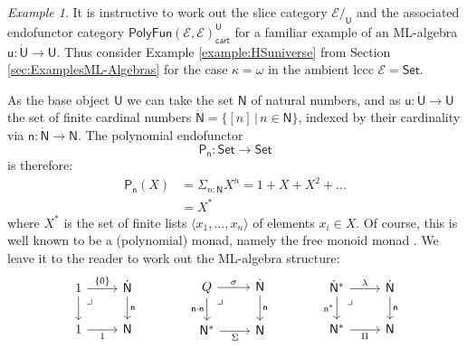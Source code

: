 \documentclass[12pt,reqno]{amsart}
\newcommand{\N}{\ensuremath{\mathbb{N}}}
\newcommand{\EE}{\ensuremath{\mathcal{E}}}
\newcommand{\Set}{\ensuremath{\mathsf{Set}}}
\newcommand{\alg}[1]{\ensuremath{\mathsf{#1}}}
\renewcommand{\to}{\ensuremath{\rightarrow}}
\renewcommand{\t}{\ensuremath{\mathsf{u}}}
\newcommand{\T}{\ensuremath{\mathsf{U}}}
\newcommand{\TT}{\ensuremath{\dot{\mathsf{U}}}}
\newcommand{\n}{\ensuremath{\mathsf{n}}}
\renewcommand{\N}{\ensuremath{\mathsf{N}}}
\newcommand{\NN}{\ensuremath{\dot{\mathsf{N}}}}
\newcommand{\pbcorner}{\arrow[dr,phantom,"\lrcorner" very near start, shift right=.5ex]} %
\theoremstyle{remark}
\newtheorem{example}[theorem]{Example}
\theoremstyle{definition}
\begin{document}
\begin{example}
It is instructive to work out the slice category $\EE/_\T$ and the associated endofunctor category $\mathsf{PolyFun}(\EE, \EE)_{\mathsf{cart}}^\T$ for a familiar example of an ML-algebra $\t:\TT\to\T$. Thus consider Example \ref{example:HSuniverse} from Section \ref{sec:ExamplesML-Algebras} for the case $\kappa = \omega$ in the ambient lccc $\EE = \Set$.  

As the base object $\T$ we can take the set $\N$ of natural numbers, and as $\t:\TT\to\T$ the set of finite cardinal numbers $\NN = \{ [n]\,|\, n\in\N\}$, indexed by their cardinality via $\n : \NN \to \N$.   The polynomial endofunctor $$\alg{P}_\n : \Set \to \Set$$ is therefore:
\begin{align*}
\alg{P}_\n(X) &= \Sigma_{n:\N}X^{n} = 1 + X + X^2 + \dots \\
& = X^*
\end{align*}
where $X^*$ is the set of finite lists $\langle x_1, \dots, x_n\rangle$ of elements $x_i \in X$.   Of course, this is well known to be a (polynomial) monad, namely the free monoid monad \cite[Example 1.9]{GambinoKoch:2013}.  We leave it to the reader to work out the ML-algebra structure:
\begin{equation*}\label{diag:MLalgN}
\begin{tikzcd}
	1 \ar[r,"\{0\}"] \ar[d] \pbcorner & \NN \ar[d, "\n"]\\  
	1 \ar[r, swap,"1"] & \N
 \end{tikzcd}\qquad\qquad
 \begin{tikzcd}
	Q  \ar[r,"\sigma"] \ar[d,swap,"{\n\cdot\n}"] \pbcorner &  \NN \ar[d, "\n"]\\  
	\N^* \ar[r,swap, "\Sigma"] & \N
\end{tikzcd} \qquad\qquad
	 \begin{tikzcd}
	\NN^* \ar[d,swap,"{\n^*}"] \ar[r,"\lambda"] \pbcorner &  \NN \ar[d, "\n"]\\  
	\N^* \ar[r,swap, "\Pi"] & \N
 \end{tikzcd} 
 \end{equation*}

\end{example}
\end{document}
